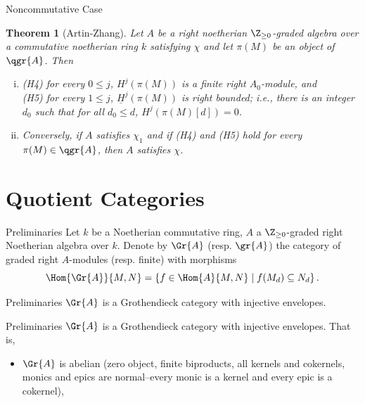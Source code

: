 \documentclass{beamer}
\newtheorem{thm}{Theorem}
\theoremstyle{definition}
\begin{document}
\begin{frame}{Noncommutative Case}
  \setcounter{thm}{1}
  \begin{thm}[Artin-Zhang]
    Let $A$ be a right noetherian $\Z_{\geq 0}$-graded algebra over a commutative noetherian ring $k$ satisfying $\chi$ and let $\pi(M)$ be an object of $\qgr{A}$.
    Then
    \begin{enumerate}[(i)]
    \item
      \begin{center}
        \begin{flushleft}
          (H4) for every $0 \leq j$, $H^j(\pi(M))$ is a finite right $A_0$-module, and\\
          (H5) for every $1 \leq j$, $\underline{H}^j(\pi(M))$ is right bounded; i.e., there is an integer $d_0$ such that for all $d_0 \leq d$, $H^{j}(\pi(M)[d]) = 0$.
        \end{flushleft}
      \end{center}
    \item
      Conversely, if $A$ satisfies $\chi_1$ and if (H4) and (H5) hold for every $\pi(M) \in \qgr{A}$, then $A$ satisfies $\chi$.
    \end{enumerate}
  \end{thm}
\end{frame}

\section{Quotient Categories}

\begin{frame}{Preliminaries}
  Let $k$ be a Noetherian commutative ring, $A$ a $\Z_{\geq 0}$-graded right Noetherian algebra over $k$.
  Denote by $\Gr{A}$ (resp. $\gr{A}$) the category of graded right $A$-modules (resp. finite) with morphisms
  $$\Hom{\Gr{A}}{M,N} = \left\{f \in \Hom{A}{M,N} \;\middle\vert\; f(M_d) \subseteq N_d\right\}.$$
\end{frame}

\begin{frame}[fragile]{Preliminaries}
  $\Gr{A}$ is a Grothendieck category with injective envelopes.
\end{frame}

\begin{frame}[fragile]{Preliminaries}
  $\Gr{A}$ is a Grothendieck category with injective envelopes.
  That is,
  \begin{itemize}
  \item
    $\Gr{A}$ is abelian (zero object, finite biproducts, all kernels and cokernels, monics and epics are normal--every monic is a kernel and every epic is a cokernel),
  \end{itemize}
\end{frame}
\end{document}
